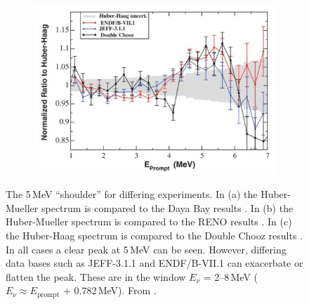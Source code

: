 \begin{figure}[!h]
\begin{subfigure}{.48\textwidth}
\includegraphics[width=\linewidth]{Chapter2/Figs/Raster/huberHaag_DoubleChooz_Rmills2015.png}
  \captionsetup{width=.9\linewidth}
  \caption{}
  \label{subFig:DoubleChooz5MevBump}
\end{subfigure}
\caption[The 5\,MeV ``shoulder'' for differing experiments.]{The 5\,MeV ``shoulder'' for differing experiments. In (a) the Huber-Mueller spectrum is compared to the Daya Bay results \cite{dayaBay2016_anFlux}. In (b) the Huber-Mueller spectrum is compared to the RENO results \cite{reno_recentResults_2014}. In (c) the Huber-Haag spectrum is compared to the Double Chooz results \cite{abe2014improved}. In all cases a clear peak at 5\,MeV can be seen. However, differing data bases such as JEFF-3.1.1 and ENDF/B-VII.1 can exacerbate or flatten the peak. These are in the window $E_\nu$ = 2--8\,MeV ($E_\nu \approx E_{\textrm{prompt}}$ + 0.782\,MeV). From  \cite{Hayes_implicationsShoulder_2015}.}
\label{fig:5MevBumps_DB_R_DC}
\end{figure} 
